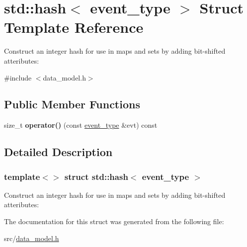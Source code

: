 \hypertarget{structstd_1_1hash_3_01event__type_01_4}{}\section{std\+:\+:hash$<$ event\+\_\+type $>$ Struct Template Reference}
\label{structstd_1_1hash_3_01event__type_01_4}


Construct an integer hash for use in maps and sets by adding bit-\/shifted atteributes\+:  




{\ttfamily \#include $<$data\+\_\+model.\+h$>$}

\subsection*{Public Member Functions}
\begin{DoxyCompactItemize}
\item 
\mbox{\label{structstd_1_1hash_3_01event__type_01_4_ad45f8465347bc54724583f2abb7c7e8f}} 
size\+\_\+t {\bfseries operator()} (const \hyperlink{structtricl_1_1event__type}{event\+\_\+type} \&evt) const
\end{DoxyCompactItemize}


\subsection{Detailed Description}
\subsubsection*{template$<$$>$\newline
struct std\+::hash$<$ event\+\_\+type $>$}

Construct an integer hash for use in maps and sets by adding bit-\/shifted atteributes\+: 

The documentation for this struct was generated from the following file\+:\begin{DoxyCompactItemize}
\item 
src/\hyperlink{data__model_8h}{data\+\_\+model.\+h}\end{DoxyCompactItemize}
